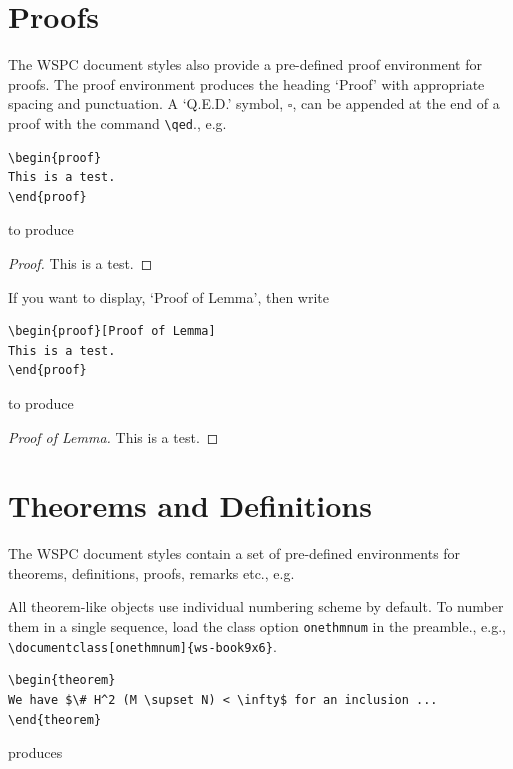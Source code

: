 \section{Proofs}
The WSPC document styles also provide a pre-defined proof
environment for proofs. The proof environment produces the heading
`Proof' with appropriate spacing and punctuation. A `Q.E.D.' symbol,
$\square$, can be appended at the end of a proof with the command
\verb|\qed|., e.g.

\begin{verbatim}
\begin{proof}
This is a test.
\end{proof}
\end{verbatim}

\noindent to produce

\begin{proof}
This is a test.
\end{proof}

If you want to display, `Proof of Lemma', then write

\begin{verbatim}
\begin{proof}[Proof of Lemma]
This is a test.
\end{proof}
\end{verbatim}

\noindent to produce

\begin{proof}[Proof of Lemma]
This is a test.
\end{proof}

\section{Theorems and Definitions}
The WSPC document styles contain a set of pre-defined
environments for theorems, definitions, proofs, remarks etc., e.g.

All theorem-like objects use individual numbering scheme by default.
To number them in a single sequence, load the class option
\verb|onethmnum| in the preamble., e.g., \verb|\documentclass[onethmnum]{ws-book9x6}|.

\begin{verbatim}
\begin{theorem}
We have $\# H^2 (M \supset N) < \infty$ for an inclusion ...
\end{theorem}
\end{verbatim}

\noindent produces

